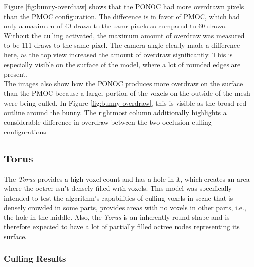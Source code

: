 \noindent
Figure \ref{fig:bunny-overdraw} shows that the \ac{PONOC} had more overdrawn pixels than the 
\ac{PMOC} configuration. The difference is in favor of \ac{PMOC}, which had only a maximum of 
43 draws to the same pixels as compared to 60 draws. Without the culling activated, the maximum 
amount of overdraw was measured to be 111 draws to the same pixel. The camera angle clearly made 
a difference here, as the top view increased the amount of overdraw significantly. This is 
especially visible on the surface of the model, where a lot of rounded edges are present. \\

\noindent
The images also show how the \ac{PONOC} produces more overdraw on the surface than the \ac{PMOC} 
because a larger portion of the voxels on the outside of the mesh were being culled. In Figure 
\ref{fig:bunny-overdraw}, this is visible as the broad red outline around the bunny. The rightmost 
column additionally highlights a considerable difference in overdraw between the two occlusion 
culling configurations.

\clearpage



\subsection*{Torus}

The \emph{Torus} provides a high voxel count and has a hole in it, which creates an area where the 
octree isn't densely filled with voxels. This model was specifically intended to test the algorithm's 
capabilities of culling voxels in scene that is densely crowded in some parts, provides areas with 
no voxels in other parts, i.e., the hole in the middle. Also, the \emph{Torus} is an inherently round 
shape and is therefore expected to have a lot of partially filled octree nodes representing its surface. 

\subsubsection*{Culling Results} \label{subsubsec-culling-results-torus}


